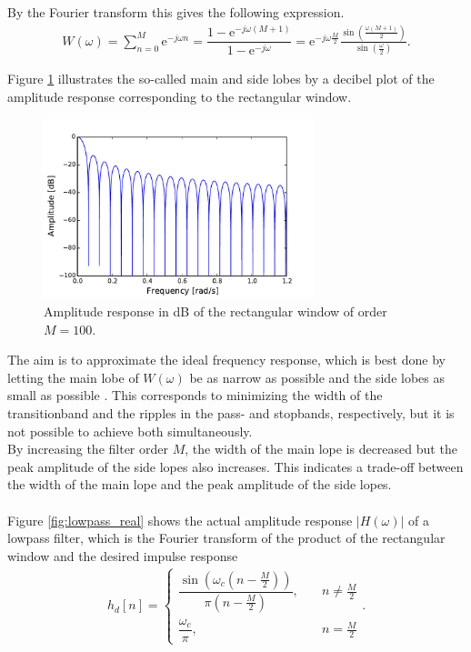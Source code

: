 By the Fourier transform this gives the following expression.
\begin{align*}
W\left(\omega\right) = \sum_{n=0}^{M} \text{e}^{-j\omega n} = \dfrac{1 - \text{e}^{-j\omega(M+1)}}{1 - \text{e}^{-j\omega}} = \text{e}^{-j\omega \frac{M}{2}} \frac{ \sin \left( \frac{\omega \left( M+1 \right)}{2} \right)}{\sin \left( \frac{\omega}{2} \right)}.
\end{align*}

Figure \ref{fig:rect_db} illustrates the so-called main and side lobes by a decibel plot of the amplitude response corresponding to the rectangular window.

\begin{figure}[H]
\centering
\includegraphics[width=0.7\textwidth]{figures/dbplots/rect.pdf}
\caption{Amplitude response in dB of the rectangular window of order $M=100$.}
\label{fig:rect_db}
\end{figure}

%
The aim is to approximate the ideal frequency response, which is best done by letting the main lobe of $W(\omega)$ be as narrow as possible and the side lobes as small as possible \cite{page 558, DTSP}. This corresponds to minimizing the width of the transitionband and the ripples in the pass- and stopbands, respectively, but it is not possible to achieve both simultaneously. \\
By increasing the filter order $M$, the width of the main lope is decreased but the peak amplitude of the side lopes also increases. This indicates a trade-off between the width of the main lope and the peak amplitude of the side lopes.
\\ \\
Figure \ref{fig:lowpass_real} shows the actual amplitude response $|H(\omega)|$ of a lowpass filter, which is the Fourier transform of the product of the rectangular window and the desired impulse response
\begin{align*}
h_d[n] =
\begin{cases}
\dfrac{\sin\left(\omega_c\left(n - \frac{M}{2}\right)\right)}{\pi\left(n-\frac{M}{2}\right)}, \quad &n \neq \frac{M}{2} \\
\dfrac{\omega_c}{\pi}, \quad &n = \frac{M}{2}
\end{cases}.
\end{align*}

